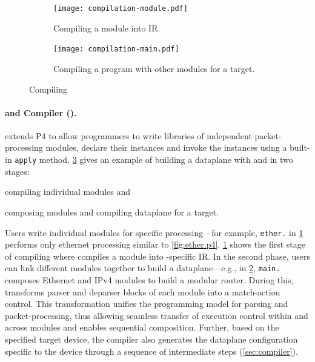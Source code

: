 \documentclass[letterpaper,twocolumn,10pt]{article}
\begin{document}
\begin{figure}[!tbp]
  \begin{subfigure}{\linewidth}
    \centering
    \texttt{[image: compilation-module.pdf]}
    \caption{Compiling a \ulang module into IR.}
    \label{fig:compile-module}
  \end{subfigure}
  \begin{subfigure}{\linewidth}
    \centering
    \texttt{[image: compilation-main.pdf]}
    \caption{Compiling a \ulang program with other modules for a
    target.}
    \label{fig:compile-to-target}
  \end{subfigure}
  \caption{Compiling \uprograms}
  \label{fig:compiler-workflow}
\end{figure}

\paragraph{\ulang and Compiler (\ucomp).}%
%
\ulang extends P4 to allow programmers to write libraries of
independent packet-processing modules, declare their instances and
invoke the instances using a built-in \texttt{apply} method.
\cref{fig:compiler-workflow} gives an example of building a dataplane
with \ulang and \ucomp in two stages:
\begin{enumerate*}[label=(\roman*)]
  \item compiling individual modules and
  \item composing modules and compiling dataplane for a target.
\end{enumerate*}
Users write individual modules for specific processing---for example,
\texttt{ether.\ulang} in \cref{fig:compile-module} performs only
ethernet processing similar to \cref{fig:ether.p4}.
\cref{fig:compile-module} shows the first stage of compiling where
\ucomp compiles a module into \uarch-specific IR. In the second phase,
users can link different modules together to build a dataplane---e.g.,
in \cref{fig:compile-to-target}, \texttt{main.\ulang} composes
Ethernet and IPv4 modules to build a modular router. During this,
\ucomp transforms parser and deparser blocks of each module into a
match-action control. This transformation unifies the programming
model for parsing and packet-processing, thus allowing seamless
transfer of execution control within and across modules and enables
sequential composition. Further, based on the specified target device,
the compiler also generates the dataplane configuration specific to
the device through a sequence of intermediate steps
(\cref{sec:compiler}).
\end{document}
